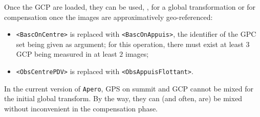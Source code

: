 Once the GCP are loaded, they can be used, , for a global transformation
or  for compensation once the images are approximatively geo-referenced:

\begin{itemize}
   \item {\tt  <BascOnCentre>} is replaced with {\tt <BascOnAppuis>}, the identifier of
          the GPC set being given as argument; for this operation, there must exist at least
          $3$ GCP being measured in at least $2$ images;


   \item {\tt <ObsCentrePDV>} is replaced with {\tt  <ObsAppuisFlottant>}.
\end{itemize}


In the current version of {\tt Apero}, GPS on summit and GCP cannot be mixed for the
initial global transform. By the way, they can (and often, are) be mixed without
inconvenient in the compensation phase.









